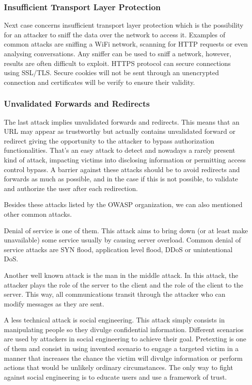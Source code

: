 \subsubsection{Insufficient Transport Layer Protection}
Next case concerns insufficient transport layer protection which is the
possibility for an attacker to sniff the data over the network to access it.
Examples of common attacks are sniffing a WiFi network, scanning for HTTP
requests or even analysing conversations. Any sniffer can be used to sniff a
network, however, results are often difficult to exploit. HTTPS protocol can
secure connections using SSL/TLS. Secure cookies will not be sent through an
unencrypted connection and certificates will be verify to ensure their
validity.

\subsubsection{Unvalidated Forwards and Redirects}
The last attack implies unvalidated forwards and redirects. This means that an
URL may appear as trustworthy but actually contains unvalidated forward or
redirect giving the opportunity to the attacker to bypass authorization
functionalities. That's an easy attack to detect and nowadays a rarely
present kind of attack, impacting victims  into disclosing information or
permitting access control bypass. A barrier against these attacks should be to
avoid redirects and forwards as much as possible, and in the case if this is
not possible, to validate and authorize the user after each redirection.

Besides these attacks listed by the OWASP organization, we can also mentioned
other common attacks.

Denial of service is one of them. This attack aims to bring down (or at least
make unavailable) some service usually by causing server overload. Common
denial of service attacks are SYN flood, application level flood, DDoS or
unintentional DoS.

Another well known attack is the man in the middle attack. In this attack, the
attacker plays the role of the server to the client and the role of the client
to the server. This way, all communications transit through the attacker who
can modify messages as they are sent.

A less technical attack is social engineering. This attack simply consists in
manipulating people so they divulge confidential information. Different
scenarios are used by attackers in social engineering to achieve their goal.
Pretexting is one of them and consist in using invented scenario to engage a
targeted victim in a manner that increases the chance the victim will divulge
information or perform actions that would be unlikely ordinary circumstances.
The only way to fight against social engineering is to educate users and use a
framework of trust.

